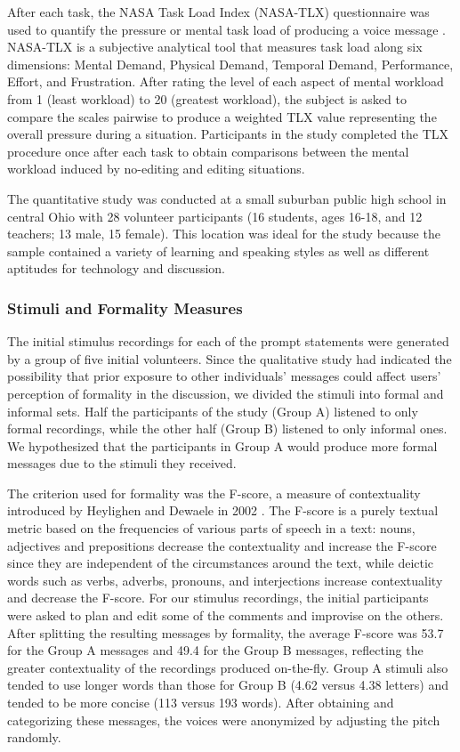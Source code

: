 After each task, the NASA Task Load Index (NASA-TLX) questionnaire was used to quantify the pressure or mental task load of producing a voice message \cite{nasatlx}. 
NASA-TLX is a subjective analytical tool that measures task load along six dimensions: Mental Demand, Physical Demand, Temporal Demand, Performance, Effort, and Frustration. 
After rating the level of each aspect of mental workload from 1 (least workload) to 20 (greatest workload), the subject is asked to compare the scales pairwise to produce a weighted TLX value representing the overall pressure during a situation. 
Participants in the study completed the TLX procedure once after each task to obtain comparisons between the mental workload induced by no-editing and editing situations.

The quantitative study was conducted at a small suburban public high school in central Ohio with 28 volunteer participants (16 students, ages 16-18, and 12 teachers; 13 male, 15 female).
This location was ideal for the study because the sample contained a variety of learning and speaking styles as well as different aptitudes for technology and discussion. 

\subsubsection{Stimuli and Formality Measures}\label{stimuli}

The initial stimulus recordings for each of the prompt statements were generated by a group of five initial volunteers. 
Since the qualitative study had indicated the possibility that prior exposure to other individuals' messages could affect users' perception of formality in the discussion, we divided the stimuli into formal and informal sets. 
Half the participants of the study (Group A) listened to only formal recordings, while the other half (Group B) listened to only informal ones.
We hypothesized that the participants in Group A would produce more formal messages due to the stimuli they received.

The criterion used for formality was the F-score, a measure of contextuality introduced by Heylighen and Dewaele in 2002 \cite{heylighen}.
The F-score is a purely textual metric based on the frequencies of various parts of speech in a text: nouns, adjectives and prepositions decrease the contextuality and increase the F-score since they are independent of the circumstances around the text, while deictic words such as verbs, adverbs, pronouns, and interjections increase contextuality and decrease the F-score. 
For our stimulus recordings, the initial participants were asked to plan and edit some of the comments and improvise on the others.
After splitting the resulting messages by formality, the average F-score was 53.7 for the Group A messages and 49.4 for the Group B messages, reflecting the greater contextuality of the recordings produced on-the-fly.
Group A stimuli also tended to use longer words than those for Group B (4.62 versus 4.38 letters) and tended to be more concise (113 versus 193 words).
After obtaining and categorizing these messages, the voices were anonymized by adjusting the pitch randomly.

